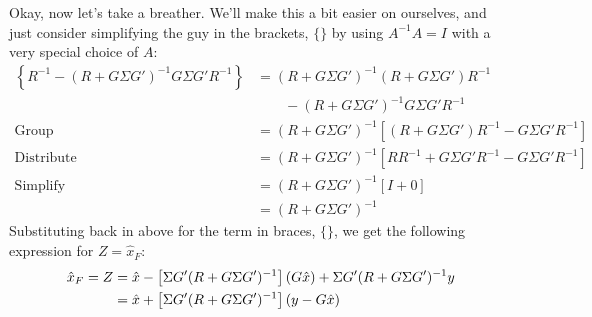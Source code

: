 \documentclass[a4paper,12pt]{article}
\begin{document}
Okay, now let's take a breather.  We'll make this a bit
easier on ourselves, and just consider simplifying the guy
in the brackets, $\{\}$ by using 
$A^{-1} A = I$ with a very special choice of $A$:
\begin{align*}
    \left\{ R^{-1}  -  (R+ G \Sigma G')^{-1}G\Sigma  
	G' R^{-1} \right\}   &=   
	(R+ G \Sigma G')^{-1} (R+ G \Sigma G') R^{-1}  \\
    &\qquad -  (R+ G \Sigma G')^{-1}G\Sigma  
	G' R^{-1} \\
    \text{Group} \quad &=   (R+ G \Sigma G')^{-1} \left[ (R+ G \Sigma G') R^{-1}  
	-  G\Sigma   G' R^{-1}\right] \\
    \text{Distribute} \quad &=   (R+ G \Sigma G')^{-1} \left[ RR^{-1} 
	+ G \Sigma G'R^{-1} -  G\Sigma   G' R^{-1}\right] \\
    \text{Simplify} \quad &=   (R+ G \Sigma G')^{-1} \left[ I 
	+ 0\right] \\
    &=   (R+ G \Sigma G')^{-1} 
\end{align*}
Substituting back in above for the term in braces, 
$\{\}$, we get the following expression
for $Z = \hat{x}_F$:
\begin{align}
    \hat{x}_F = Z &= \hat{x} 
	- \left[\Sigma G' (R + G \Sigma G')^{-1}  \right]
	\left( G \hat{x} \right)  
	+ \Sigma G'  (R+ G \Sigma G')^{-1} y \notag \\
    &= \hat{x} 
	+ \left[\Sigma G' (R + G \Sigma G')^{-1}  \right]
	\left( y - G \hat{x} \right)  
\end{align}
\end{document}
